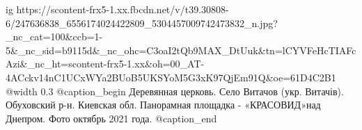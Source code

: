  
 
 
 
 

\ifcmt
  ig https://scontent-frx5-1.xx.fbcdn.net/v/t39.30808-6/247636838_6556174024422809_5304457009742473832_n.jpg?_nc_cat=100&ccb=1-5&_nc_sid=b9115d&_nc_ohc=C3oaI2tQb9MAX_DtUuk&tn=lCYVFeHcTIAFcAzi&_nc_ht=scontent-frx5-1.xx&oh=00_AT-4ACckv14nC1UCxWYa2BUoB5UKSYoM5G3xK97QjEm91Q&oe=61D4C2B1
  @width 0.3
  @caption_begin
    Деревянная церковь.
    Село Витачов (укр. Витачів). Обуховский р-н. Киевская обл. 
    Панорамная площадка - «КРАСОВИД»над Днепром. Фото октябрь 2021 года.
  @caption_end
\fi
